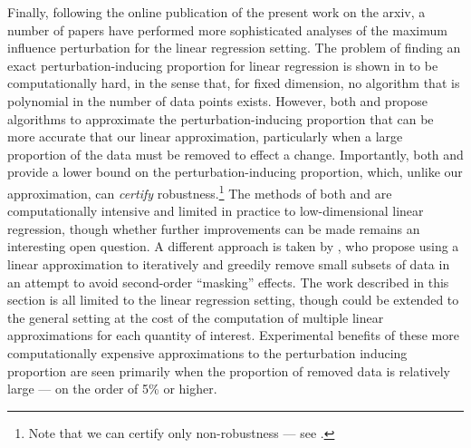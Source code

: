 Finally, following the online publication of the present work on the arxiv, a
number of papers have performed more sophisticated analyses of the maximum
influence perturbation for the linear regression setting.  The problem of
finding an exact perturbation-inducing proportion for linear regression is shown
in \citet{moitra:2022:provablyauditingols} to be computationally hard, in the
sense that, for fixed dimension, no algorithm that is polynomial in the number
of data points exists.  However, both \citet{moitra:2022:provablyauditingols}
and \citet{freund:2023:robustnessauditingols} propose algorithms to approximate
the perturbation-inducing proportion that can be more accurate that our linear
approximation, particularly when a large proportion of the data must be removed
to effect a change.  Importantly, both \citet{moitra:2022:provablyauditingols}
and \citet{freund:2023:robustnessauditingols} provide a lower bound on the
perturbation-inducing proportion, which, unlike our approximation, can {\em
certify} robustness.\footnote{Note that we can certify only non-robustness ---
see .} The methods of both \citet{moitra:2022:provablyauditingols}
and \citet{freund:2023:robustnessauditingols} are computationally intensive and
limited in practice to low-dimensional linear regression, though whether further
improvements can be made remains an interesting open question.  A different
approach is taken by \citet{kuschnig:2021:hiddeninfluencescores}, who propose
using a linear approximation to iteratively and greedily remove small subsets of
data in an attempt to avoid second-order ``masking'' effects.  The work
described in this section is all limited to the linear regression setting,
though \citet{kuschnig:2021:hiddeninfluencescores} could be extended to the
general setting at the cost of the computation of multiple linear approximations
for each quantity of interest.  Experimental benefits of these more
computationally expensive approximations to the perturbation inducing
proportion are seen primarily when the proportion of removed data is relatively
large --- on the order of 5\% or higher.



%
%
%
